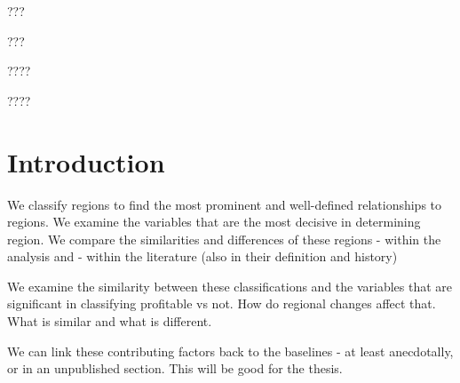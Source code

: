\documentclass[review,12pt,authoryear]{elsarticle}
\begin{document}
\begin{linenumbers}
\begin{frontmatter}
\begin{highlights}
  \item ???
  \item ???
  \item ????
  \item ????
\end{highlights}
\end{frontmatter}


\section{Introduction}

%
%
%   
%


We classify regions to find the most prominent and well-defined relationships to regions.
We examine the variables that are the most decisive in determining region.
We compare the similarities and differences of these regions
- within the analysis and
- within the literature (also in their definition and history)

We examine the similarity between these classifications and the variables that are significant in classifying profitable vs not.
How do regional changes affect that. What is similar and what is different.

We can link these contributing factors back to the baselines - at least anecdotally, or in an unpublished section. This will be good for the thesis.

\fi


\end{linenumbers}
\end{document}

